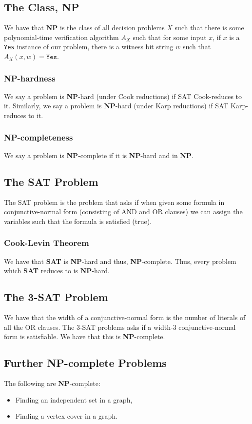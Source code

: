 \subsection{The Class, \textbf{NP}}

We have that \textbf{NP} is the class of all decision problems $X$ such that there is some
polynomial-time verification algorithm $A_X$ such that for some input $x$, 
if $x$ is a \texttt{Yes} instance of our problem, there is a witness bit string $w$
such that $A_X(x, w) = \texttt{Yes}$.

\subsubsection{\textbf{NP}-hardness}

We say a problem is \textbf{NP}-hard (under Cook reductions) if SAT Cook-reduces to it.
Similarly, we say a problem is \textbf{NP}-hard (under Karp reductions) if SAT Karp-reduces to it.

\subsubsection{\textbf{NP}-completeness}

We say a problem is \textbf{NP}-complete if it is \textbf{NP}-hard and in \textbf{NP}.

\subsection{The SAT Problem}

The SAT problem is the problem that asks if when given some formula in conjunctive-normal form
(consisting of AND and OR clauses) we can assign the variables such that the formula is 
satisfied (true).

\subsubsection{Cook-Levin Theorem}

We have that \textbf{SAT} is \textbf{NP}-hard and thus, \textbf{NP}-complete.
Thus, every problem which \textbf{SAT} reduces to is \textbf{NP}-hard.

\subsection{The 3-SAT Problem}

We have that the width of a conjunctive-normal form is the number of literals
of all the OR clauses. The 3-SAT problems asks if a width-3 conjunctive-normal 
form is satisfiable. We have that this is \textbf{NP}-complete.

\subsection{Further \textbf{NP}-complete Problems}

The following are \textbf{NP}-complete: \begin{itemize}
  \item Finding an independent set in a graph,
  \item Finding a vertex cover in a graph.
\end{itemize}